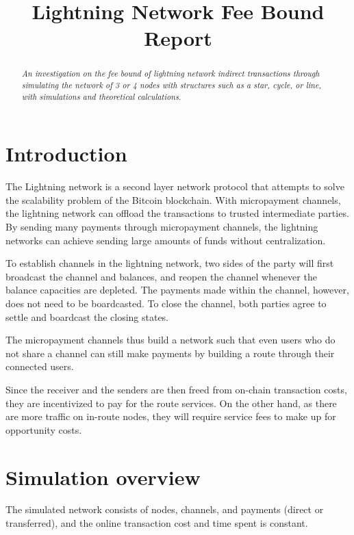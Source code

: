 \documentclass[twocolumn,10pt]{report}
\title{Lightning Network Fee Bound Report}
\author{
    \affiliation{
    Email: hope@chaincode.com
    }	
}
\begin{document}
\maketitle

\begin{abstract}
    {\it An investigation on the fee bound of lightning network indirect transactions through simulating the network of 3 or 4 nodes with structures such as a star, cycle, or line, with simulations and theoretical calculations. 
    } 
\end{abstract}

\section{Introduction}
The Lightning network is a second layer network protocol that attempts to solve the scalability problem of the Bitcoin blockchain. With micropayment channels, the lightning network can offload the transactions to trusted intermediate parties. By sending many payments through micropayment channels, the lightning networks can achieve sending large amounts of funds without centralization. 

To establish channels in the lightning network, two sides of the party will first broadcast the channel and balances, and reopen the channel whenever the balance capacities are depleted.  The payments made within the channel, however, does not need to be boardcasted. To close the channel, both parties agree to settle and boardcast the closing states. 

The micropayment channels thus build a network such that even users who do not share a channel can still make payments by building a route through their connected users. 

Since the receiver and the senders are then freed from on-chain transaction costs, they are incentivized to pay for the route services. On the other hand, as there are more traffic on in-route nodes, they will require service fees to make up for opportunity costs.

\section{Simulation overview}

The simulated network consists of nodes, channels, and payments (direct or transferred), and the online transaction cost and time spent is constant. 
\end{document}
